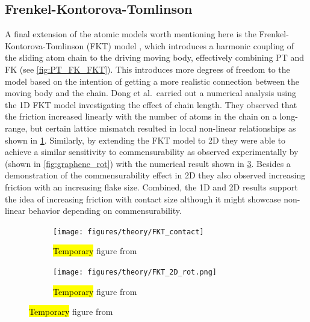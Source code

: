 \subsection{Frenkel-Kontorova-Tomlinson}
A final extension of the atomic models worth mentioning here is the
Frenkel-Kontorova-Tomlinson (\acrshort{FKT}) model \cite{weiss_dry_1997}, which
introduces a harmonic coupling of the sliding atom chain to the driving moving
body, effectively combining \acrshort{PT} and \acrshort{FK} (see \cref{fig:PT_FK_FKT}). This introduces
more degrees of freedom to the model based on the intention of getting a more realistic connection between the moving body and the chain. Dong et al.\ carried out a numerical analysis using the 1D \acrshort{FKT} model investigating the effect of chain length. They observed that the friction increased linearly with the number of atoms in the chain on a long-range, but certain lattice mismatch resulted in local non-linear relationships as shown in \cref{fig:FKT_contact}. Similarly, by extending the \acrshort{FKT} model to 2D they were able to achieve a similar sensitivity to commensurability as observed experimentally by \cite{DIENWIEBEL2005197} (shown in
\cref{fig:graphene_rot}) with the numerical result shown in \cref{fig:FKT_2D_rot}. Besides a demonstration of the commensurability effect in 2D they also observed increasing friction with an increasing flake size. Combined, the 1D and 2D results support the idea of increasing friction with contact size although it might showcase non-linear behavior depending on commensurability.


\begin{figure}[H]
  \centering
  \begin{subfigure}[t]{0.49\textwidth}
      \centering
      \texttt{[image: figures/theory/FKT\_contact]}
      \label{fig:FKT_contact}
      \caption{\hl{Temporary} figure from \cite{Yalin_2011} }
  \end{subfigure}
  \hfill
  \begin{subfigure}[t]{0.49\textwidth}
      \centering
      \texttt{[image: figures/theory/FKT\_2D\_rot.png]}
      \label{fig:FKT_2D_rot}
      \caption{\hl{Temporary} figure from \cite{Yalin_2011} }
  \end{subfigure}
  \hfill
\end{figure}



